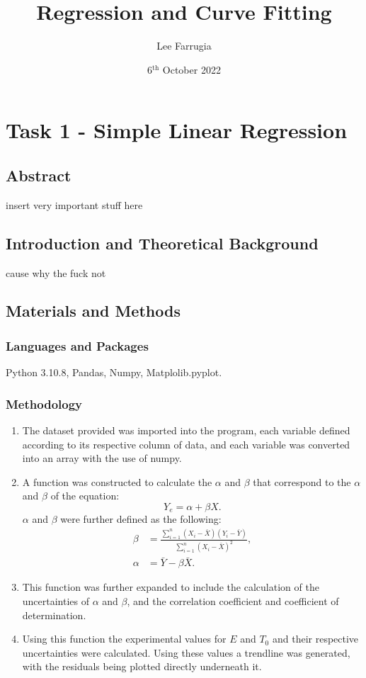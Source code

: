 \documentclass[12pt, a4paper]{article}
\title{Regression and Curve Fitting}
\date{6\(^\text{{th}}\) October 2022}
\author{Lee Farrugia}
\begin{document}
    
\maketitle
\thispagestyle{titlepagestyle}
\pagestyle{mystyle}

\section*{Task 1 - Simple Linear Regression}
\subsection*{Abstract}
insert very important stuff here

\subsection*{Introduction and Theoretical Background}
cause why the fuck not

\subsection*{Materials and Methods}

\subsubsection*{Languages and Packages}
Python 3.10.8, Pandas, Numpy, Matplolib.pyplot.

\subsubsection*{Methodology}
\begin{enumerate}
    \item The dataset provided was imported into the program, each variable defined according to its respective column of data, and each variable was converted into an array with the use of numpy.
    \item A function was constructed to calculate the \(\alpha\) and \(\beta\) that correspond to the \(\alpha\) and \(\beta\) of the equation:
    \begin{equation}
        Y_e = \alpha + \beta X .
    \end{equation}
    \(\alpha\) and \(\beta\) were further defined as the following:
    \begin{align}
        \beta &= \frac{\sum_{i=1}^{n}(X_i - \bar{X})(Y_i - \bar{Y})}{\sum_{i=1}^{n}(X_i - \bar{X})^2} ,\\
        \alpha &= \bar{Y} - \beta \bar{X} .
    \end{align}
    \item This function was further expanded to include the calculation of the uncertainties of \(\alpha\) and \(\beta\), and the correlation coefficient and coefficient of determination.
    \item Using this function the experimental values for \(E\) and \(T_0\) and their respective uncertainties were calculated. Using these values a trendline was generated, with the residuals being plotted directly underneath it. 
\end{enumerate}
\end{document}
